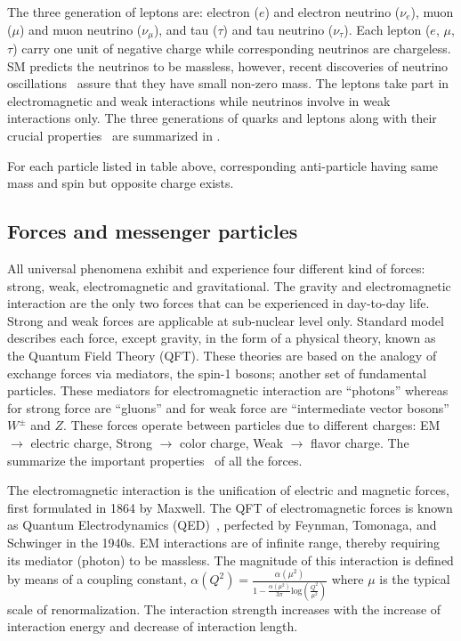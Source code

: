 The three generation of leptons are: electron ($e$) and electron neutrino ($\nu_{e}$), muon ($\mu$) and muon neutrino ($\nu_{\mu}$), and tau ($\tau$)
and tau neutrino ($\nu_{\tau}$). Each lepton ($e$, $\mu$, $\tau$) carry one unit of negative charge while corresponding neutrinos are chargeless. SM predicts the
neutrinos to be massless, however, recent discoveries of neutrino oscillations~\cite{Fukuda:1998mi, Fukuda:2001nk, Ahmad:2002jz, Araki:2004mb, Aliu:2004sq, Michael:2006rx} assure that they have small non-zero mass. The leptons take part in electromagnetic and weak interactions while neutrinos involve in weak interactions only.
The three generations of quarks and leptons along with their crucial properties~\cite{Agashe:2014kda} are summarized in \tab{\ref{Table:SMparticles}}.

For each particle listed in table above, corresponding anti-particle having same mass and spin but opposite charge exists. 
\subsection{Forces and messenger particles}
All universal phenomena exhibit and experience four different kind of forces: strong, weak, electromagnetic and gravitational.
The gravity and electromagnetic interaction are the only two forces that can be experienced in day-to-day life.  
Strong and weak forces are applicable at sub-nuclear level only.
Standard model describes each force, except gravity, in the form of a physical theory, known as the Quantum Field Theory (QFT).
These theories are based on the analogy of exchange forces via mediators, the spin-1 bosons; another set of fundamental particles.
These mediators for electromagnetic interaction are ``photons'' whereas for strong force are ``gluons'' and for weak force are
``intermediate vector bosons'' $W^{\pm}$ and $Z$.  These forces operate between particles due to different charges: EM $\rightarrow$
electric charge, Strong $\rightarrow$ color charge, Weak $\rightarrow$ flavor charge. The \tab{\ref{Table:SMforces}} summarize the important
properties~\cite{Agashe:2014kda} of all the forces.



The electromagnetic interaction is the unification of electric and magnetic forces, first formulated in 1864 by Maxwell. The QFT of electromagnetic forces is known
as Quantum Electrodynamics (QED)~\cite{Feynman:1948ur, Feynman:1948km, Tomonaga:1948zz, Schwinger:1948iu, Schwinger:1948yk, Dyson:1949bp, Peskin:1995ev},
perfected by Feynman, Tomonaga, and Schwinger in the 1940s. EM interactions are of infinite range, thereby requiring its mediator (photon) to be massless.
The magnitude of this interaction is defined by means of a coupling constant,
$\alpha(Q^{2})= \frac{\alpha(\mu^{2})}{ 1 - \frac{\alpha(\mu^{2})}{3\pi}\text{log}\left(\frac{Q^{2}}{\mu^{2}}\right)}$
where $\mu$ is the typical scale of renormalization. The interaction strength increases with the increase of interaction energy and decrease of interaction length.

